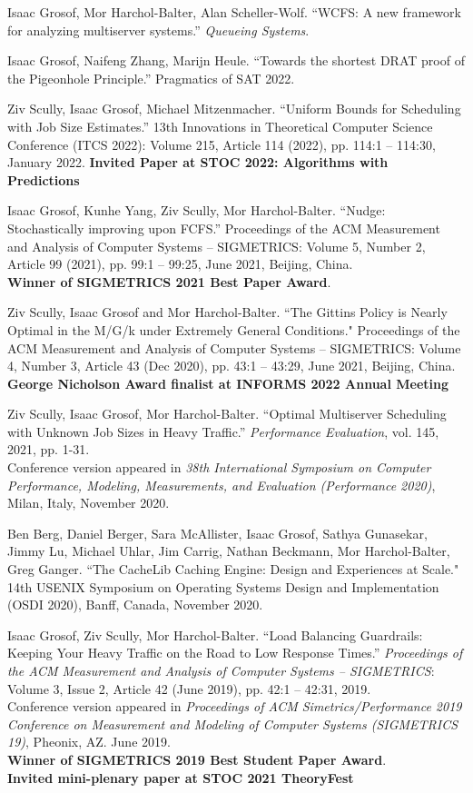 \documentclass{res}
\begin{document}
\begin{resume}
    Isaac Grosof, Mor Harchol-Balter, Alan Scheller-Wolf.
    ``WCFS: A new framework for analyzing multiserver systems.''
    \textit{Queueing Systems}.

    Isaac Grosof, Naifeng Zhang, Marijn Heule.
    ``Towards the shortest DRAT proof of the Pigeonhole Principle.''
    Pragmatics of SAT 2022.

    Ziv Scully, Isaac Grosof, Michael Mitzenmacher.
    ``Uniform Bounds for Scheduling with Job Size Estimates.'' 
    13th Innovations in Theoretical Computer Science Conference (ITCS 2022):
    Volume 215, Article 114 (2022), pp. 114:1 -- 114:30, January 2022.
    \textbf{Invited Paper at STOC 2022: Algorithms with Predictions}

    Isaac Grosof, Kunhe Yang, Ziv Scully, Mor Harchol-Balter.
    ``Nudge: Stochastically improving upon FCFS.''
    Proceedings of the ACM Measurement and Analysis of Computer Systems -- SIGMETRICS: Volume 5, Number 2, Article 99 (2021), pp. 99:1 -- 99:25, June 2021, Beijing, China.\\
    \textbf{Winner of SIGMETRICS 2021 Best Paper Award}.

    Ziv Scully, Isaac Grosof and Mor Harchol-Balter.
    ``The Gittins Policy is Nearly Optimal in the M/G/k under Extremely General Conditions."
    Proceedings of the ACM Measurement and Analysis of Computer Systems -- SIGMETRICS: Volume 4, Number 3, Article 43 (Dec 2020), pp. 43:1 -- 43:29, June 2021, Beijing, China. \\
    \textbf{George Nicholson Award finalist at INFORMS 2022 Annual Meeting}

    Ziv Scully, Isaac Grosof, Mor Harchol-Balter.
    ``Optimal Multiserver Scheduling with Unknown Job Sizes in Heavy Traffic.''
    \textit{Performance Evaluation}, vol. 145, 2021, pp. 1-31. \\
    Conference version appeared in
    \textit{38th International Symposium on Computer Performance, Modeling, Measurements, and Evaluation (Performance 2020)},
    Milan, Italy, November 2020.

	Ben Berg, Daniel Berger, Sara McAllister, Isaac Grosof, Sathya Gunasekar, Jimmy Lu, Michael Uhlar,
	Jim Carrig, Nathan Beckmann, Mor Harchol-Balter, Greg Ganger.
	``The CacheLib Caching Engine: Design and Experiences at Scale."
	14th USENIX Symposium on Operating Systems Design and Implementation (OSDI 2020),
	Banff, Canada, November 2020.

    Isaac Grosof, Ziv Scully, Mor Harchol-Balter.
    ``Load Balancing Guardrails: Keeping Your Heavy Traffic on the Road to Low Response Times.''
    \textit{Proceedings of the ACM Measurement and Analysis of Computer Systems -- SIGMETRICS}:
    Volume 3, Issue 2, Article 42 (June 2019), pp. 42:1 -- 42:31, 2019. \\
    Conference version appeared in \textit{Proceedings of ACM Simetrics/Performance 2019
    Conference on Measurement and Modeling of Computer Systems (SIGMETRICS 19)}, Pheonix, AZ.
    June 2019.\\
    \textbf{Winner of SIGMETRICS 2019 Best Student Paper Award}. \\
    \textbf{Invited mini-plenary paper at STOC 2021 TheoryFest}


\end{resume}
\end{document}
